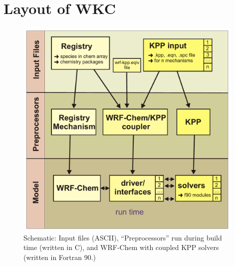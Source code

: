 \documentclass[twoside, 12pt, letterpaper]{article}
\begin{document}
\section{Layout of WKC}
\begin{figure}[h]
  \begin{center}
  \includegraphics[width=11cm]{figs/wkc_schematic_2}  
  \end{center}
  \caption{\label{fig:schem} Schematic: Input files (ASCII), ``Preprocessors'' run during build time (written in C), and  WRF-Chem with coupled KPP solvers (written in Fortran 90.)}
\end{figure}
\end{document}
